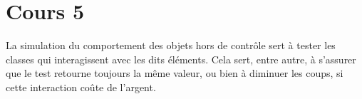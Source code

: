 \section{Cours 5}
La simulation du comportement des objets hors de contrôle sert à tester les classes qui interagissent avec les dits
éléments. Cela sert, entre autre, à s'assurer que le test retourne toujours la même valeur, ou bien à diminuer les
coups, si cette interaction coûte de l'argent.
